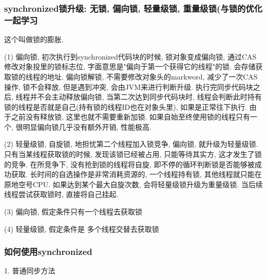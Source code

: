 \subsubsection{synchronized锁升级: 无锁, 偏向锁, 轻量级锁, 重量级锁(与锁的优化一起学习}
这个叫做锁的膨胀. \par
(1) 偏向锁, 初次执行到synchronized代码块的时候, 锁对象变成偏向锁, 通过CAS修改对象投里的锁标志位, 字面意思是"偏向于第一个获得它的线程"的锁. 会存储获取锁的线程的地址. 偏向锁解锁, 不需要修改对象头的markword, 减少了一次CAS操作, 锁不会释放, 但是遇到冲突, 会由JVM来进行判断升级. 执行完同步代码块之后, 线程并不会主动释放偏向锁, 当第二次达到同步代码块时, 线程会判断此时持有锁的线程是否就是自己(持有锁的线程ID也在对象头里), 如果是正常往下执行. 由于之前没有释放锁, 这里也就不需要重新加锁. 如果自始至终使用锁的线程只有一个, 很明显偏向锁几乎没有额外开销, 性能极高. \par
(2) 轻量级锁, 自旋锁, 地担忧第二个线程加入锁竞争, 偏向锁, 就升级为轻量级锁. 只有当某线程获取锁的时候, 发现该锁已经被占用, 只能等待其实方, 这才发生了锁的竞争. 在所竞争下, 没有抢到锁的线程将自旋, 即不停的循环判断锁是否能够被成功获取. 长时间的自选操作是非常消耗资源的, 一个线程持有锁, 其他线程就只能在原地空号CPU. 如果达到某个最大自旋次数, 会将轻量级锁升级为重量级锁. 当后续线程尝试获取锁时, 直接将自己挂起.\par
(3) 偏向锁, 假定条件只有一个线程去获取锁 \par
(4) 轻量级锁, 假定条件是 多个线程交替去获取锁 \par
\subsubsection{如何使用synchronized}
1. 普通同步方法
